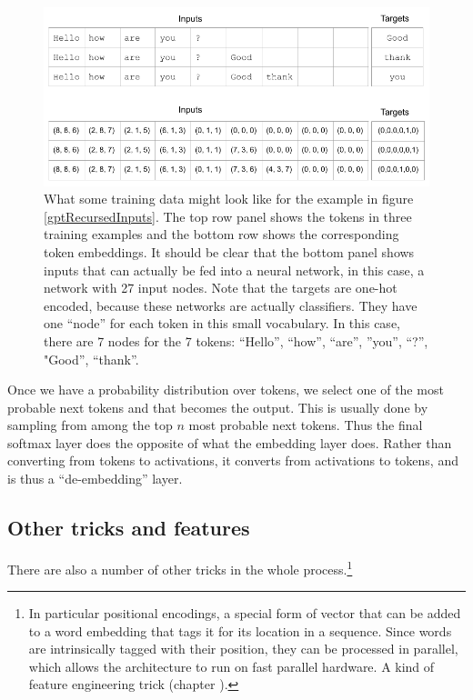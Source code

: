 \begin{figure}[h]
\centering
\includegraphics[scale=.45]{./images/contextWindow.png}
\caption[Jeff Yoshimi]{What some training data might look like for the example in figure \ref{gptRecursedInputs}. The top row panel shows the tokens in three training examples and the bottom row shows the corresponding token embeddings.  It should be clear that the bottom panel shows inputs that can actually be fed into a neural network, in this case, a network with 27 input nodes. Note that the targets are one-hot encoded, because these networks are actually classifiers. They have one ``node'' for each token in this small vocabulary. In this case, there are 7 nodes for the 7 tokens: ``Hello'', ``how'', ``are'', ''you'', ``?'', "Good'', ``thank''.  }
\label{contextWindow}
\end{figure}

Once we have a probability distribution over tokens, we select one of the most probable next tokens and that becomes the output. This is usually done by sampling from among the top $n$ most probable next tokens. Thus the final softmax layer does the opposite of what the embedding layer does. Rather than converting from tokens to activations, it converts from activations to tokens, and is thus a ``de-embedding'' layer.

\subsection{Other tricks and features}

There are also a number of other tricks in the whole process.\footnote{In particular positional encodings, a special form of vector that can be added to a word embedding that tags it for its location in a sequence. Since words are intrinsically tagged with their position, they can be processed in parallel, which allows the architecture to run on fast parallel hardware. A kind of feature engineering trick (chapter ).  }

